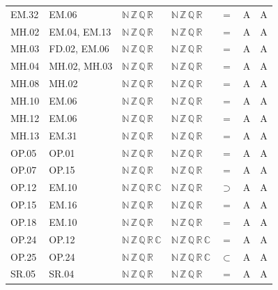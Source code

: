 {\begin{longtable}{l l l l c c c}
EM.32 & EM.06 & $\mathbb N\,\mathbb Z\,\mathbb Q\,\mathbb R$ & $\mathbb N\,\mathbb Z\,\mathbb Q\,\mathbb R$ & $=$ & A & A \\
MH.02 & EM.04, EM.13 & $\mathbb N\,\mathbb Z\,\mathbb Q\,\mathbb R$ & $\mathbb N\,\mathbb Z\,\mathbb Q\,\mathbb R$ & $=$ & A & A \\
MH.03 & FD.02, EM.06 & $\mathbb N\,\mathbb Z\,\mathbb Q\,\mathbb R$ & $\mathbb N\,\mathbb Z\,\mathbb Q\,\mathbb R$ & $=$ & A & A \\
MH.04 & MH.02, MH.03 & $\mathbb N\,\mathbb Z\,\mathbb Q\,\mathbb R$ & $\mathbb N\,\mathbb Z\,\mathbb Q\,\mathbb R$ & $=$ & A & A \\
MH.08 & MH.02 & $\mathbb N\,\mathbb Z\,\mathbb Q\,\mathbb R$ & $\mathbb N\,\mathbb Z\,\mathbb Q\,\mathbb R$ & $=$ & A & A \\
MH.10 & EM.06 & $\mathbb N\,\mathbb Z\,\mathbb Q\,\mathbb R$ & $\mathbb N\,\mathbb Z\,\mathbb Q\,\mathbb R$ & $=$ & A & A \\
MH.12 & EM.06 & $\mathbb N\,\mathbb Z\,\mathbb Q\,\mathbb R$ & $\mathbb N\,\mathbb Z\,\mathbb Q\,\mathbb R$ & $=$ & A & A \\
MH.13 & EM.31 & $\mathbb N\,\mathbb Z\,\mathbb Q\,\mathbb R$ & $\mathbb N\,\mathbb Z\,\mathbb Q\,\mathbb R$ & $=$ & A & A \\
OP.05 & OP.01 & $\mathbb N\,\mathbb Z\,\mathbb Q\,\mathbb R$ & $\mathbb N\,\mathbb Z\,\mathbb Q\,\mathbb R$ & $=$ & A & A \\
OP.07 & OP.15 & $\mathbb N\,\mathbb Z\,\mathbb Q\,\mathbb R$ & $\mathbb N\,\mathbb Z\,\mathbb Q\,\mathbb R$ & $=$ & A & A \\
OP.12 & EM.10 & $\mathbb N\,\mathbb Z\,\mathbb Q\,\mathbb R\,\mathbb C$ & $\mathbb N\,\mathbb Z\,\mathbb Q\,\mathbb R$ & $\supset$ & A & A \\
OP.15 & EM.16 & $\mathbb N\,\mathbb Z\,\mathbb Q\,\mathbb R$ & $\mathbb N\,\mathbb Z\,\mathbb Q\,\mathbb R$ & $=$ & A & A \\
OP.18 & EM.10 & $\mathbb N\,\mathbb Z\,\mathbb Q\,\mathbb R$ & $\mathbb N\,\mathbb Z\,\mathbb Q\,\mathbb R$ & $=$ & A & A \\
OP.24 & OP.12 & $\mathbb N\,\mathbb Z\,\mathbb Q\,\mathbb R\,\mathbb C$ & $\mathbb N\,\mathbb Z\,\mathbb Q\,\mathbb R\,\mathbb C$ & $=$ & A & A \\
OP.25 & OP.24 & $\mathbb N\,\mathbb Z\,\mathbb Q\,\mathbb R$ & $\mathbb N\,\mathbb Z\,\mathbb Q\,\mathbb R\,\mathbb C$ & $\subset$ & A & A \\
SR.05 & SR.04 & $\mathbb N\,\mathbb Z\,\mathbb Q\,\mathbb R$ & $\mathbb N\,\mathbb Z\,\mathbb Q\,\mathbb R$ & $=$ & A & A \\

\end{longtable}}
